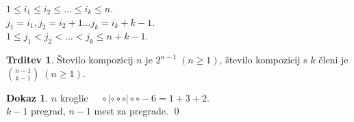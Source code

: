 \documentclass[a4paper, 12pt]{book}
\theoremstyle{definition}
\newtheorem{claim}[counter]{Trditev}
\newtheorem{pro}[counter]{Dokaz}
\theoremstyle{remark}
\begin{document}
$1 \leq i_1 \leq i_2 \leq \dots \leq i_k \leq n$. \\
$j_1 = i_1, j_2 = i_2+1 \dots j_k = i_k+k-1$. \\
$1 \leq j_1 < j_2 < \dots < j_k \leq n+k-1$.
\begin{claim}
  Število kompozicij $n$ je $2^{n-1} \; (n \geq 1)$, število kompozicij s $k$ členi je $\binom{n-1}{k-1} \; (n \geq 1)$.
\end{claim}
\begin{pro}
  $n$ kroglic $\quad \circ | \circ \circ \circ | \circ \circ - 6 = 1 + 3 + 2$. \\
  $k-1$ pregrad, $n-1$ mest za pregrade.
  \qed
\end{pro}




%
%



\end{document}
